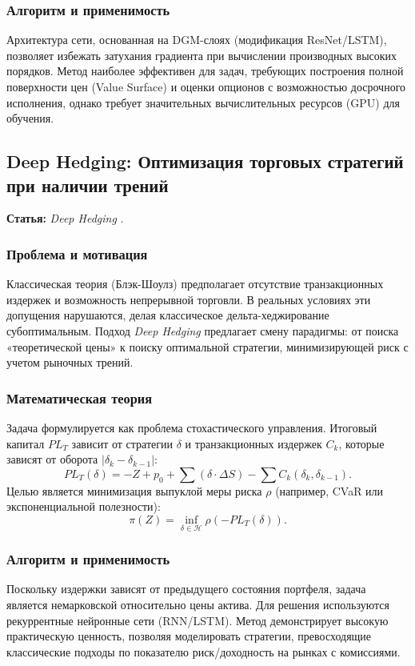 \documentclass[12pt, a4paper]{article}
\begin{document}
\subsubsection{Алгоритм и применимость}
Архитектура сети, основанная на DGM-слоях (модификация ResNet/LSTM), позволяет избежать затухания градиента при вычислении производных высоких порядков. Метод наиболее эффективен для задач, требующих построения полной поверхности цен (Value Surface) и оценки опционов с возможностью досрочного исполнения, однако требует значительных вычислительных ресурсов (GPU) для обучения.

\subsection{Deep Hedging: Оптимизация торговых стратегий при наличии трений}
\textbf{Статья:} \textit{Deep Hedging} \cite{Buehler2019}.

\subsubsection{Проблема и мотивация}
Классическая теория (Блэк-Шоулз) предполагает отсутствие транзакционных издержек и возможность непрерывной торговли. В реальных условиях эти допущения нарушаются, делая классическое дельта-хеджирование субоптимальным. Подход \textit{Deep Hedging} предлагает смену парадигмы: от поиска «теоретической цены» к поиску оптимальной стратегии, минимизирующей риск с учетом рыночных трений.

\subsubsection{Математическая теория}
Задача формулируется как проблема стохастического управления. Итоговый капитал $PL_T$ зависит от стратегии $\delta$ и транзакционных издержек $C_k$, которые зависят от оборота $|\delta_k - \delta_{k-1}|$:
\begin{equation}
    PL_T(\delta) = -Z + p_0 + \sum (\delta \cdot \Delta S) - \sum C_k(\delta_k, \delta_{k-1}).
\end{equation}
Целью является минимизация выпуклой меры риска $\rho$ (например, CVaR или экспоненциальной полезности):
\begin{equation}
    \pi(Z) = \inf_{\delta \in \mathcal{H}} \rho \left( - PL_T(\delta) \right).
\end{equation}

\subsubsection{Алгоритм и применимость}
Поскольку издержки зависят от предыдущего состояния портфеля, задача является немарковской относительно цены актива. Для решения используются рекуррентные нейронные сети (RNN/LSTM). Метод демонстрирует высокую практическую ценность, позволяя моделировать стратегии, превосходящие классические подходы по показателю риск/доходность на рынках с комиссиями.
\end{document}

